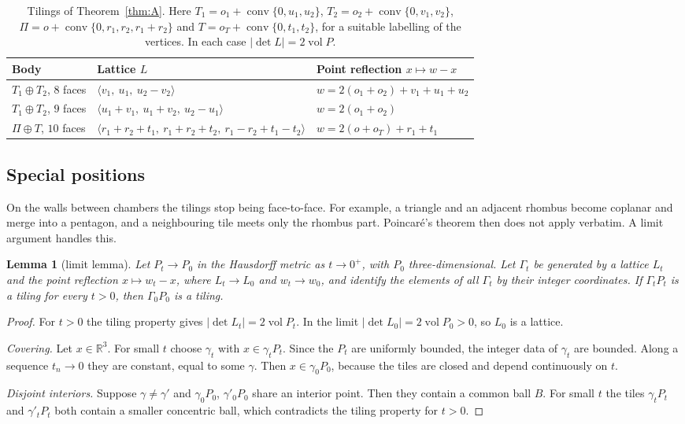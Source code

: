 \documentclass[11pt]{amsart}
\newtheorem{lemma}[thm]{Lemma}
\theoremstyle{definition}
\newcommand{\R}{\mathbb{R}}
\newcommand{\msum}{\oplus}
\DeclareMathOperator{\conv}{conv}
\DeclareMathOperator{\vol}{vol}
\begin{document}
\begin{table}[t]
\centering
\renewcommand{\arraystretch}{1.25}
\begin{tabular}{@{}lll@{}}
\toprule
Body & Lattice $L$ & Point reflection $x\mapsto w-x$ \\
\midrule
$T_1\msum T_2$, $8$ faces & $\langle v_1,\ u_1,\ u_2-v_2\rangle$ & $w = 2(o_1+o_2)+v_1+u_1+u_2$ \\
$T_1\msum T_2$, $9$ faces & $\langle u_1+v_1,\ u_1+v_2,\ u_2-u_1\rangle$ & $w = 2(o_1+o_2)$ \\
$\Pi\msum T$, $10$ faces & $\langle r_1+r_2+t_1,\ r_1+r_2+t_2,\ r_1-r_2+t_1-t_2\rangle$ & $w=2(o+o_T)+r_1+t_1$\\
\bottomrule
\end{tabular}
\medskip
\caption{Tilings of Theorem~\ref{thm:A}. Here $T_1=o_1+\conv\{0,u_1,u_2\}$, $T_2=o_2+\conv\{0,v_1,v_2\}$,
$\Pi = o+\conv\{0,r_1,r_2,r_1+r_2\}$ and $T=o_T+\conv\{0,t_1,t_2\}$, for a suitable labelling of the vertices. In each
case $|\det L| = 2\vol P$.}\label{tab:lattices}
\end{table}

\subsection{Special positions}
On the walls between chambers the tilings stop being face-to-face. For example, a triangle and an adjacent rhombus
become coplanar and merge into a pentagon, and a neighbouring tile meets only the rhombus part. Poincar\'e's
theorem then does not apply verbatim. A limit argument handles this.

\begin{lemma}[limit lemma]\label{lem:limit}
Let $P_t\to P_0$ in the Hausdorff metric as $t\to 0^+$, with $P_0$ three-dimensional. Let $\Gamma_t$ be
generated by a lattice $L_t$ and the point reflection $x\mapsto w_t-x$, where $L_t\to L_0$ and $w_t\to w_0$, and
identify the elements of all $\Gamma_t$ by their integer coordinates. If $\Gamma_t P_t$ is a tiling for every $t>0$,
then $\Gamma_0P_0$ is a tiling.
\end{lemma}
\begin{proof}
For $t>0$ the tiling property gives $|\det L_t| = 2\vol P_t$. In the limit $|\det L_0| = 2\vol P_0>0$, so $L_0$ is a
lattice.

\emph{Covering.} Let $x\in\R^3$. For small $t$ choose $\gamma_t$ with $x\in\gamma_tP_t$. Since the $P_t$ are uniformly
bounded, the integer data of $\gamma_t$ are bounded. Along a sequence $t_n\to0$ they are constant, equal to some
$\gamma$. Then $x\in\gamma_0P_0$, because the tiles are closed and depend continuously on $t$.

\emph{Disjoint interiors.} Suppose $\gamma\ne\gamma'$ and $\gamma_0P_0$, $\gamma'_0P_0$ share an interior point.
Then they contain a common ball $B$. For small $t$ the tiles $\gamma_tP_t$ and $\gamma'_tP_t$ both contain a smaller
concentric ball, which contradicts the tiling property for $t>0$.
\end{proof}
\end{document}
